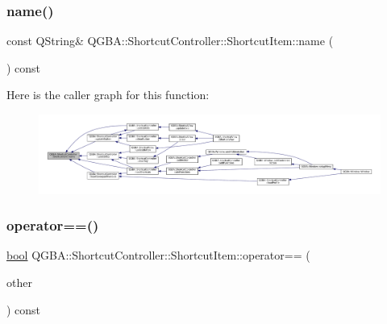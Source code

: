 \mbox{\label{class_q_g_b_a_1_1_shortcut_controller_1_1_shortcut_item_a5efd926d69c160940c2698c31a7de8c3}} 
\subsubsection{\texorpdfstring{name()}{name()}}
{\footnotesize\ttfamily const Q\+String\& Q\+G\+B\+A\+::\+Shortcut\+Controller\+::\+Shortcut\+Item\+::name (\begin{DoxyParamCaption}{ }\end{DoxyParamCaption}) const\hspace{0.3cm}{\ttfamily [inline]}}

Here is the caller graph for this function\+:
\nopagebreak
\begin{figure}[H]
\begin{center}
\leavevmode
\includegraphics[width=350pt]{class_q_g_b_a_1_1_shortcut_controller_1_1_shortcut_item_a5efd926d69c160940c2698c31a7de8c3_icgraph}
\end{center}
\end{figure}
\mbox{\label{class_q_g_b_a_1_1_shortcut_controller_1_1_shortcut_item_adf92f12596961539589a9e6e7fcb8737}} 
\subsubsection{\texorpdfstring{operator==()}{operator==()}}
{\footnotesize\ttfamily \mbox{\hyperlink{libretro_8h_a4a26dcae73fb7e1528214a068aca317e}{bool}} Q\+G\+B\+A\+::\+Shortcut\+Controller\+::\+Shortcut\+Item\+::operator== (\begin{DoxyParamCaption}\item[{const \mbox{\hyperlink{class_q_g_b_a_1_1_shortcut_controller_1_1_shortcut_item}{Shortcut\+Item}} \&}]{other }\end{DoxyParamCaption}) const\hspace{0.3cm}{\ttfamily [inline]}}

